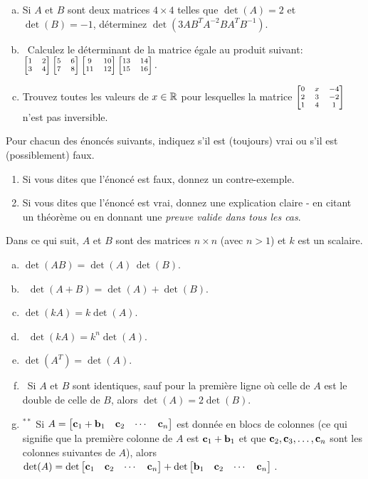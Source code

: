 \begin{prob}
\begin{enumerate}[a)]
\item Si $A$ et $B$ sont deux matrices $4\times 4$ telles que $\det (A)=2$
et $\det(B)=-1$, déterminez $\det(3AB^TA^{-2}BA^TB^{-1})$.
\smallskip

\item\sov~Calculez le d\'eterminant de la matrice égale au produit suivant:
$\scriptsize\bmatrix 1&2\cr3&4 \endbmatrix\bmatrix 5&6\cr7&8\endbmatrix 
\bmatrix9&10\cr11&12\endbmatrix\bmatrix 13&14\cr15&16\endbmatrix.$
\smallskip
\item  Trouvez toutes les valeurs de $x\in\mathbb{R}$ pour lesquelles la matrice $\scriptsize\bmatrix 0&x&-
4\cr2&3&-2\cr1&4&1\endbmatrix$ n'est pas inversible.
\medskip
\end{enumerate}
\end{prob} \begin{prob} \label{prob21.4} Pour chacun des énoncés suivants, indiquez s'il est (toujours) vrai ou s'il est (possiblement) faux.   
\begin{enumerate}[$\bullet$]
\item Si vous dites que l'\'enonc\'e est faux, donnez un contre-exemple.   
\item Si vous dites que l'\'enonc\'e est vrai, donnez une explication claire - en citant un théorème ou en donnant une {\it preuve valide dans tous les cas}. 
\end{enumerate}

\medskip Dans ce qui suit, $A$ et $B$ sont des matrices $n \times n$ (avec $n>1$) et $k$ est un scalaire.

\medskip
\begin{enumerate}[a)]
\item $\det (AB) = \det (A) \, \det (B)$.
\medskip

\item\sov~$\det (A +B) = \det (A) +\det (B)$.
\medskip

\item $\det (k A)= k \det (A)$.
\medskip

\item\sov~$\det (k A)= k^n \det (A)$.
\medskip

\item $\det  (A^T) = \det (A)$.
\medskip

\item\sov~Si $A$ et $B$ sont identiques, sauf pour la première ligne o\`u celle de $A$ est le double de celle de $B$, alors $\det(A)=2 \det(B)$.
\medskip

\item$^{\ast\ast}$ Si $A=\bmatrix \cc_1 +\bb_1 & \cc_2 & \cdots& \cc_n \endbmatrix$ est donn\'ee en blocs de colonnes (ce qui signifie que la première colonne de $A$ est $\mathbf{c}_1 +\mathbf{b}_1$ et que $\mathbf{c}_2, \mathbf{c}_3, \dots, \mathbf{c}_n$ sont les colonnes suivantes de $A$), alors $\det(A)=   \det \bmatrix \cc_1  & \cc_2 & \cdots& \cc_n \endbmatrix + \det \bmatrix  \bb_1 & \cc_2 & \cdots& \cc_n \endbmatrix $\,. 
\medskip



\end{enumerate}
\end{prob}
